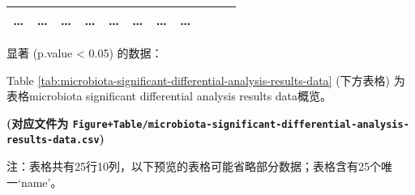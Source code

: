 \documentclass[
]{article}
\begin{document}
\begin{longtable}[]{@{}lllllllllll@{}}
\begin{minipage}[t]{0.06\columnwidth}
\ldots{}\strut
\end{minipage} & \begin{minipage}[t]{0.09\columnwidth}\raggedright
\ldots{}\strut
\end{minipage} & \begin{minipage}[t]{0.06\columnwidth}\raggedright
\ldots{}\strut
\end{minipage} & \begin{minipage}[t]{0.09\columnwidth}\raggedright
\ldots{}\strut
\end{minipage} & \begin{minipage}[t]{0.06\columnwidth}\raggedright
\ldots{}\strut
\end{minipage} & \begin{minipage}[t]{0.06\columnwidth}\raggedright
\ldots{}\strut
\end{minipage} & \begin{minipage}[t]{0.06\columnwidth}\raggedright
\ldots{}\strut
\end{minipage} & \begin{minipage}[t]{0.03\columnwidth}\raggedright
\ldots{}\strut
\end{minipage}\tabularnewline
\bottomrule
\end{longtable}

显著 (p.value \textless{} 0.05) 的数据：

Table \ref{tab:microbiota-significant-differential-analysis-results-data} (下方表格) 为表格microbiota significant differential analysis results data概览。

\textbf{(对应文件为 \texttt{Figure+Table/microbiota-significant-differential-analysis-results-data.csv})}

\begin{center}\begin{tcolorbox}[colback=gray!10, colframe=gray!50, width=0.9\linewidth, arc=1mm, boxrule=0.5pt]注：表格共有25行10列，以下预览的表格可能省略部分数据；表格含有25个唯一`name'。
\end{tcolorbox}
\end{center}
\end{document}
